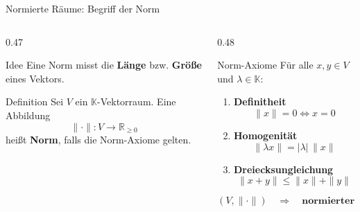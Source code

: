 \begin{frame}{Normierte Räume: Begriff der Norm}

\begin{columns}[T]

\begin{column}{0.47\linewidth}

\begin{blockC1}{Idee}
Eine Norm misst die \textbf{Länge} bzw. \textbf{Größe} eines Vektors.
\end{blockC1}

\begin{blockDef}{Definition}
Sei $V$ ein $\mathbb{K}$-Vektorraum.
Eine Abbildung
\[
\|\cdot\| : V \to \mathbb{R}_{\geq 0}
\]
heißt \textbf{Norm}, falls die Norm-Axiome gelten.
\end{blockDef}

\end{column}

\begin{column}{0.48\linewidth}

\begin{blockC2}{Norm-Axiome}
Für alle $x,y\in V$ und $\lambda\in\mathbb{K}$:
\begin{enumerate}
\item \textbf{Definitheit}
\[
\|x\|=0 \iff x=0
\]

\item \textbf{Homogenität}
\[
\|\lambda x\| = |\lambda|\,\|x\|
\]

\item \textbf{Dreiecksungleichung}
\[
\|x+y\|
\leq
\|x\|+\|y\|
\]
\end{enumerate}
\end{blockC2}

\[
(V,\|\cdot\|)
\quad\Rightarrow\quad
\textbf{normierter Raum}
\]

\end{column}

\end{columns}

\end{frame}


